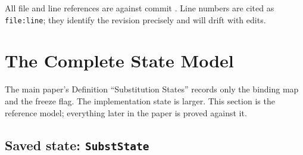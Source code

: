 \documentclass[11pt]{article}
\begin{document}
All file and line references are against commit \texttt{\skjspinhash}. Line
numbers are cited as \texttt{file:line}; they identify the revision
precisely and will drift with edits.

\section{The Complete State Model}
\label{sec:model}

The main paper's Definition ``Substitution States'' records only the
binding map and the freeze flag. The implementation state is larger. This
section is the reference model; everything later in the paper is proved
against it.

\subsection{Saved state: \texttt{SubstState}}
\end{document}
